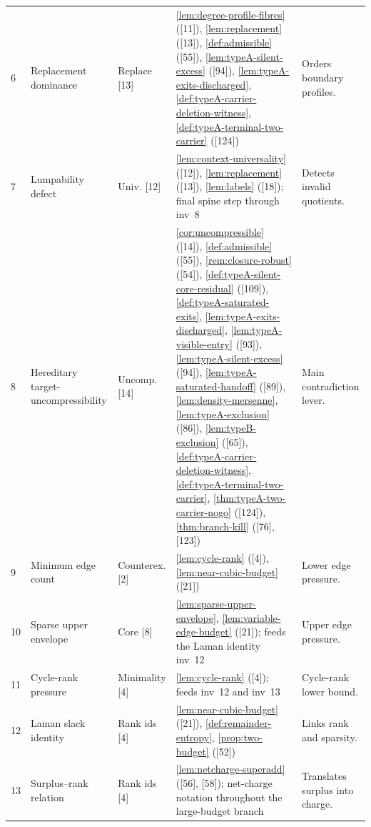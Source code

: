 \documentclass[11pt]{article}
\begin{document}
{\begin{longtable}{C{0.032\textwidth} L{0.145\textwidth} L{0.105\textwidth} L{0.50\textwidth} L{0.155\textwidth}}
6 & Replacement dominance & Replace {[13]} & \cref{lem:degree-profile-fibres} ([11]), \cref{lem:replacement} ([13]), \cref{def:admissible} ([55]), \cref{lem:typeA-silent-excess} ([94]), \cref{lem:typeA-exits-discharged}, \cref{def:typeA-carrier-deletion-witness}, \cref{def:typeA-terminal-two-carrier} ([124]) & Orders boundary profiles. \\
7 & Lumpability defect & Univ. {[12]} & \cref{lem:context-universality} ([12]), \cref{lem:replacement} ([13]), \cref{lem:labels} ([18]); final spine step through inv~8 & Detects invalid quotients. \\
8 & Hereditary target-uncompressibility & Uncomp. {[14]} & \cref{cor:uncompressible} ([14]), \cref{def:admissible} ([55]), \cref{rem:closure-robust} ([54]), \cref{def:typeA-silent-core-residual} ([109]), \cref{def:typeA-saturated-exits}, \cref{lem:typeA-exits-discharged}, \cref{lem:typeA-visible-entry} ([93]), \cref{lem:typeA-silent-excess} ([94]), \cref{lem:typeA-saturated-handoff} ([89]), \cref{lem:density-mersenne}, \cref{lem:typeA-exclusion} ([86]), \cref{lem:typeB-exclusion} ([65]), \cref{def:typeA-carrier-deletion-witness}, \cref{def:typeA-terminal-two-carrier}, \cref{thm:typeA-two-carrier-nogo} ([124]), \cref{thm:branch-kill} ([76], [123]) & Main contradiction lever. \\
9 & Minimum edge count & Counterex. {[2]} & \cref{lem:cycle-rank} ([4]), \cref{lem:near-cubic-budget} ([21]) & Lower edge pressure. \\
10 & Sparse upper envelope & Core {[8]} & \cref{lem:sparse-upper-envelope}, \cref{lem:variable-edge-budget} ([21]); feeds the Laman identity inv~12 & Upper edge pressure. \\
11 & Cycle-rank pressure & Minimality {[4]} & \cref{lem:cycle-rank} ([4]); feeds inv~12 and inv~13 & Cycle-rank lower bound. \\
12 & Laman slack identity & Rank ids {[4]} & \cref{lem:near-cubic-budget} ([21]), \cref{def:remainder-entropy}, \cref{prop:two-budget} ([52]) & Links rank and sparsity. \\
13 & Surplus--rank relation & Rank ids {[4]} & \cref{lem:netcharge-superadd} ([56], [58]); net-charge notation throughout the large-budget branch & Translates surplus into charge. \\

\end{longtable}}
\end{document}
